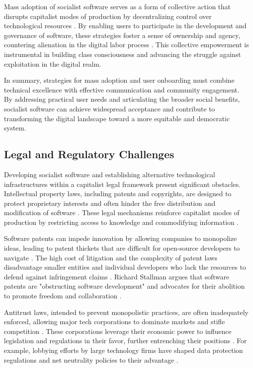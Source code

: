 \begin{refsection}
Mass adoption of socialist software serves as a form of collective action that disrupts capitalist modes of production by decentralizing control over technological resources \cite[pp.~929--930]{Marx1976}. By enabling users to participate in the development and governance of software, these strategies foster a sense of ownership and agency, countering alienation in the digital labor process \cite[pp.~77--83]{Braverman1998}. This collective empowerment is instrumental in building class consciousness and advancing the struggle against exploitation in the digital realm.

In summary, strategies for mass adoption and user onboarding must combine technical excellence with effective communication and community engagement. By addressing practical user needs and articulating the broader social benefits, socialist software can achieve widespread acceptance and contribute to transforming the digital landscape toward a more equitable and democratic system.

\subsection{Legal and Regulatory Challenges}

Developing socialist software and establishing alternative technological infrastructures within a capitalist legal framework present significant obstacles. Intellectual property laws, including patents and copyrights, are designed to protect proprietary interests and often hinder the free distribution and modification of software \cite[pp.~25--27]{Lessig2004}. These legal mechanisms reinforce capitalist modes of production by restricting access to knowledge and commodifying information \cite[pp.~45--47]{Boyle2008}.

Software patents can impede innovation by allowing companies to monopolize ideas, leading to patent thickets that are difficult for open-source developers to navigate \cite[pp.~14--16]{Bessen2008}. The high cost of litigation and the complexity of patent laws disadvantage smaller entities and individual developers who lack the resources to defend against infringement claims \cite[pp.~57]{Stallman2010}. Richard Stallman argues that software patents are "obstructing software development" and advocates for their abolition to promote freedom and collaboration \cite[pp.~57]{Stallman2010}.

Antitrust laws, intended to prevent monopolistic practices, are often inadequately enforced, allowing major tech corporations to dominate markets and stifle competition \cite[pp.~85--88]{Wu2018}. These corporations leverage their economic power to influence legislation and regulations in their favor, further entrenching their positions \cite[pp.~150--152]{Varoufakis2017}. For example, lobbying efforts by large technology firms have shaped data protection regulations and net neutrality policies to their advantage \cite[pp.~200--202]{Zuboff2019}.


\end{refsection}
